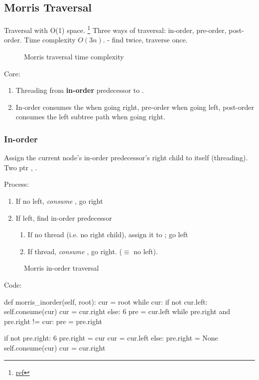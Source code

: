 \subsection{Morris Traversal} 
Traversal with O(1) space. \footnote{\href{http://www.cnblogs.com/AnnieKim/archive/2013/06/15/MorrisTraversal.html}{ref}}
Three ways of traversal: in-order, pre-order, post-order.
Time complexity $O(3n).$ - find  twice,  traverse once.
\begin{figure}[hbtp]
\centering
{}
\caption{Morris traversal time complexity}
\label{fig:morrisTime}
\end{figure}

Core:
\begin{enumerate}
\item Threading from \textbf{in-order} predecessor to .
\item In-order consumes the  when going right, pre-order when going left, post-order consumes the left subtree path when going right. 
\end{enumerate}
\subsubsection{In-order}
Assign the current node's in-order predecessor's right child to itself (threading). Two ptr , . 

Process:
\begin{enumerate}
\item If no left, \textit{consume} , go right 
\item If left, find in-order predecessor 
\begin{enumerate}
\item If no thread (i.e. no  right child), assign it to ; go left
\item If thread, \textit{consume} , go right. ($\equiv$ no left). 
\end{enumerate}
\end{enumerate}

\begin{figure*}[!htb]
\centering
{}
\caption{Morris in-order traversal}
\label{fig:morrisInorder}
\end{figure*}
\newpage
Code:
\begin{python}
def morris_inorder(self, root):
    cur = root
    while cur:
        if not cur.left:
            self.consume(cur)
            cur = cur.right
        else:  6
            pre = cur.left
            while pre.right and pre.right != cur:
                pre = pre.right

            if not pre.right:
                 6  pre.right = cur
                cur = cur.left
            else:
                pre.right = None
                self.consume(cur)
                cur = cur.right
\end{python}
